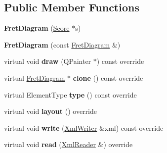 \subsection*{Public Member Functions}
\begin{DoxyCompactItemize}
\item 
\mbox{\label{class_ms_1_1_fret_diagram_a4d4ce180c8aafdb1f7a7c9d7dc477c7c}} 
{\bfseries Fret\+Diagram} (\hyperlink{class_ms_1_1_score}{Score} $\ast$s)
\item 
\mbox{\label{class_ms_1_1_fret_diagram_a7d309f03c525c438076bd435f57e20c8}} 
{\bfseries Fret\+Diagram} (const \hyperlink{class_ms_1_1_fret_diagram}{Fret\+Diagram} \&)
\item 
\mbox{\label{class_ms_1_1_fret_diagram_abb1ec6ea4679b0501b40e10d744366bc}} 
virtual void {\bfseries draw} (Q\+Painter $\ast$) const override
\item 
\mbox{\label{class_ms_1_1_fret_diagram_a67965b8b6d3c50bb649114169f59d1b0}} 
virtual \hyperlink{class_ms_1_1_fret_diagram}{Fret\+Diagram} $\ast$ {\bfseries clone} () const override
\item 
\mbox{\label{class_ms_1_1_fret_diagram_a420e7ebe2de34a29a4498e4ddac158a7}} 
virtual Element\+Type {\bfseries type} () const override
\item 
\mbox{\label{class_ms_1_1_fret_diagram_ac56384b75744dd0e10debf869a718dea}} 
virtual void {\bfseries layout} () override
\item 
\mbox{\label{class_ms_1_1_fret_diagram_ac56b846464e473ecbf6d2420744f7da7}} 
virtual void {\bfseries write} (\hyperlink{class_ms_1_1_xml_writer}{Xml\+Writer} \&xml) const override
\item 
\mbox{\label{class_ms_1_1_fret_diagram_a7810f9b9065385d3e679a41c12a8a72f}} 
virtual void {\bfseries read} (\hyperlink{class_ms_1_1_xml_reader}{Xml\+Reader} \&) override
\item 
\mbox{\label{class_ms_1_1_fret_diagram_a86d6365a5e0416b7703d36f44555e790}} 

\end{DoxyCompactItemize}
